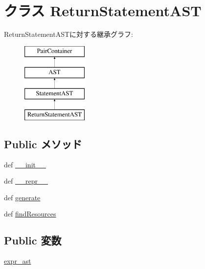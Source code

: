 \hypertarget{classslicc_1_1ast_1_1ReturnStatementAST_1_1ReturnStatementAST}{
\section{クラス ReturnStatementAST}
\label{classslicc_1_1ast_1_1ReturnStatementAST_1_1ReturnStatementAST}
}
ReturnStatementASTに対する継承グラフ:\begin{figure}[H]
\begin{center}
\leavevmode
\includegraphics[height=4cm]{classslicc_1_1ast_1_1ReturnStatementAST_1_1ReturnStatementAST}
\end{center}
\end{figure}
\subsection*{Public メソッド}
\begin{DoxyCompactItemize}
\item 
def \hyperlink{classslicc_1_1ast_1_1ReturnStatementAST_1_1ReturnStatementAST_ac775ee34451fdfa742b318538164070e}{\_\-\_\-init\_\-\_\-}
\item 
def \hyperlink{classslicc_1_1ast_1_1ReturnStatementAST_1_1ReturnStatementAST_ad8b9328939df072e4740cd9a63189744}{\_\-\_\-repr\_\-\_\-}
\item 
def \hyperlink{classslicc_1_1ast_1_1ReturnStatementAST_1_1ReturnStatementAST_a4555d1cee0dccf3942ea35fe86de2e8e}{generate}
\item 
def \hyperlink{classslicc_1_1ast_1_1ReturnStatementAST_1_1ReturnStatementAST_abd195c795639b490ba2de4c1246105f1}{findResources}
\end{DoxyCompactItemize}
\subsection*{Public 変数}
\begin{DoxyCompactItemize}
\item 
\hyperlink{classslicc_1_1ast_1_1ReturnStatementAST_1_1ReturnStatementAST_a4faa2d9c34d29aa06b2dacd8c3aee45d}{expr\_\-ast}
\end{DoxyCompactItemize}


